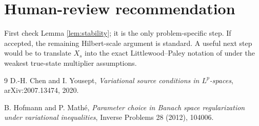 \documentclass[11pt]{article}
\begin{document}
\section*{Human-review recommendation}

First check Lemma \ref{lem:stability}; it is the only problem-specific step. If
accepted, the remaining Hilbert-scale argument is standard. A useful next step
would be to translate \(X_s\) into the exact Littlewood--Paley notation of
\cite{ChenYousept2020} under the weakest true-state multiplier assumptions.

\begin{thebibliography}{9}
D.-H. Chen and I. Yousept,
\emph{Variational source conditions in \(L^p\)-spaces},
arXiv:2007.13474, 2020.

B. Hofmann and P. Math\'e,
\emph{Parameter choice in Banach space regularization under variational
inequalities},
Inverse Problems 28 (2012), 104006.
\end{thebibliography}
\end{document}
